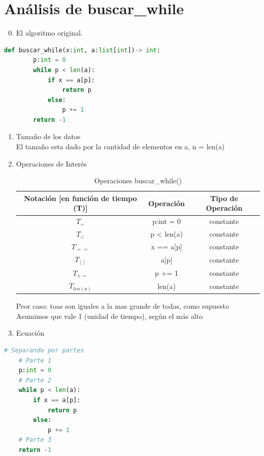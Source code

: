 \documentclass[stu, 12pt, letterpaper, donotrepeattitle, floatsintext, natbib, helv]{apa7}
\begin{document}
\section{Análisis de buscar\_while}
\begin{enumerate}
    \setcounter{enumi}{-1}
    \item El algoritmo original.
\end{enumerate}
\begin{lstlisting}[language=Python]
    def buscar_while(x:int, a:list[int])-> int:
        p:int = 0
        while p < len(a):
            if x == a[p]:
                return p
            else:
                p += 1
        return -1
\end{lstlisting}
\begin{enumerate}
    \setcounter{enumi}{0}
    \item Tamaño de los datos \\
El tamaño esta dado por la cantidad de elementos en a, n = len(a)
    \item Operaciones de Interés \\
    \begin{table}[h]
        \centering
        \begin{tabular}{|c c c|} 
         \hline
         Notación [en función de tiempo (T)] & Operación & Tipo de Operación \\ [0.5ex] 
         \hline\hline
         $T_=$ & p:int = 0 & constante \\ 
         \hline
         $T_<$ & p < len(a) & constante \\
         \hline
         $T_{==}$ & x == a[p] & constante \\
         \hline
         $T_{[]}$ & a[p] & constante \\
         \hline
         $T_{+=}$ & p += 1 & constante \\
         \hline
         $T_{len(a)}$ & len(a) & constante \\ [1ex]
         \hline
        \end{tabular}
        \caption{Operaciones buscar\_while()}
        \label{tab:tablewhile}
    \end{table}
        Peor caso: toas son iguales a la mas grande de todas, como supuesto \\
        Asumimos que vale 1 (unidad de tiempo), según el más alto
    \item Ecuación
    \end{enumerate}
\begin{lstlisting}[language=Python]
    # Separando por partes
    # Parte 1
    p:int = 0
    # Parte 2
    while p < len(a):
        if x == a[p]:
            return p
        else:
            p += 1
    # Parte 3
    return -1
\end{lstlisting}
\end{document}
